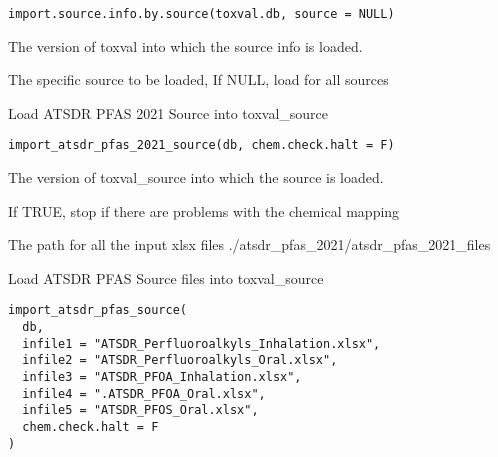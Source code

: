 \documentclass[letterpaper]{book}
\begin{document}
%
\begin{Usage}
\begin{verbatim}
import.source.info.by.source(toxval.db, source = NULL)
\end{verbatim}
\end{Usage}
%
\begin{Arguments}
\begin{ldescription}
\item[\code{toxval.db}] The version of toxval into which the source info is loaded.

\item[\code{source}] The specific source to be loaded, If NULL, load for all sources
\end{ldescription}
\end{Arguments}
%
\begin{Description}\relax
Load ATSDR PFAS 2021 Source into toxval\_source
\end{Description}
%
\begin{Usage}
\begin{verbatim}
import_atsdr_pfas_2021_source(db, chem.check.halt = F)
\end{verbatim}
\end{Usage}
%
\begin{Arguments}
\begin{ldescription}
\item[\code{db}] The version of toxval\_source into which the source is loaded.

\item[\code{chem.check.halt}] If TRUE, stop if there are problems with the chemical mapping

\item[\code{indir}] The path for all the input xlsx files ./atsdr\_pfas\_2021/atsdr\_pfas\_2021\_files
\end{ldescription}
\end{Arguments}
%
\begin{Description}\relax
Load ATSDR PFAS Source files into toxval\_source
\end{Description}
%
\begin{Usage}
\begin{verbatim}
import_atsdr_pfas_source(
  db,
  infile1 = "ATSDR_Perfluoroalkyls_Inhalation.xlsx",
  infile2 = "ATSDR_Perfluoroalkyls_Oral.xlsx",
  infile3 = "ATSDR_PFOA_Inhalation.xlsx",
  infile4 = ".ATSDR_PFOA_Oral.xlsx",
  infile5 = "ATSDR_PFOS_Oral.xlsx",
  chem.check.halt = F
)
\end{verbatim}
\end{Usage}
\end{document}
